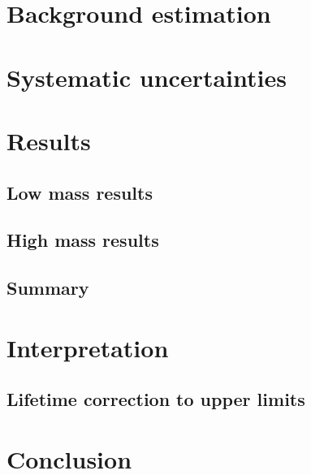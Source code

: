 	
\clearpage




\section{Background estimation}
\subsection{}
\subsection{}
\subsection{}
\subsection{}
\subsection{}

\section{Systematic uncertainties}
\section{Results}
\subsection{Low mass results}
\subsection{High mass results}
\subsection{Summary}

\section{Interpretation}
\subsection{Lifetime correction to upper limits}

\section{Conclusion}
